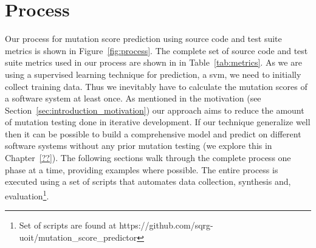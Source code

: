 \section{Process}
\label{sec:approach_process}
Our process for mutation score prediction using source code and test suite metrics is shown in Figure~\ref{fig:process}. The complete set of source code and test suite metrics used in our process are shown in in Table~\ref{tab:metrics}. As we are using a supervised learning technique for prediction, a \gls{svm}, we need to initially collect training data. Thus we inevitably have to calculate the mutation scores of a software system at least once. As mentioned in the motivation (see Section~\ref{sec:introduction_motivation}) our approach aims to reduce the amount of mutation testing done in iterative development. If our technique generalize well then it can be possible to build a comprehensive model and predict on different software systems without any prior mutation testing (we explore this in Chapter~\ref{??}). The following sections walk through the complete process one phase at a time, providing examples where possible. The entire process is executed using a set of scripts that automates data collection, synthesis and, evaluation\footnote{Set of scripts are found at https://github.com/sqrg-uoit/mutation\_score\_predictor}.

